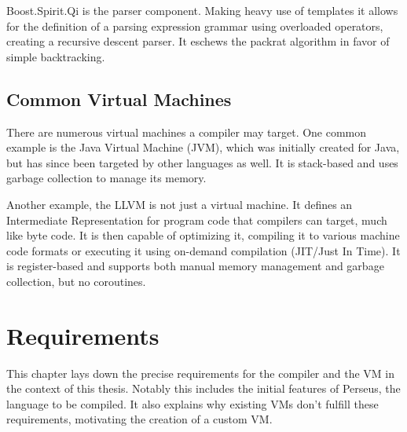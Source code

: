 		Boost.Spirit.Qi is the parser component. Making heavy use of templates it allows for the definition of a parsing expression grammar using overloaded operators, creating a recursive descent parser. It eschews the packrat algorithm in favor of simple backtracking.

	\section{Common Virtual Machines}
		
		There are numerous virtual machines a compiler may target. One common example is the Java Virtual Machine (JVM), which was initially created for Java, but has since been targeted by other languages as well. It is stack-based and uses garbage collection to manage its memory.
		
		Another example, the LLVM is not just a virtual machine. It defines an Intermediate Representation for program code that compilers can target, much like byte code. It is then capable of optimizing it, compiling it to various machine code formats or executing it using on-demand compilation (JIT/Just In Time). It is register-based and supports both manual memory management and garbage collection, but no coroutines.
	

\chapter{Requirements}\label{requirements}

	
	This chapter lays down the precise requirements for the compiler and the VM in the context of this thesis. Notably this includes the initial features of Perseus, the language to be compiled. It also explains why existing VMs don't fulfill these requirements, motivating the creation of a custom VM.

